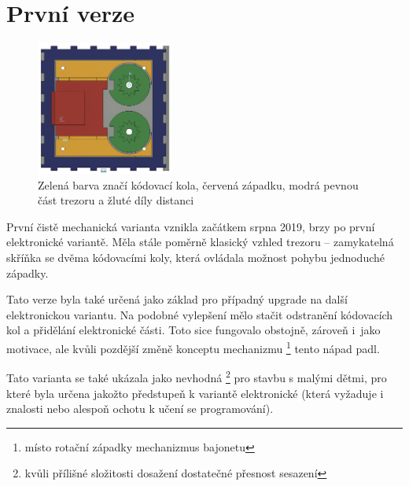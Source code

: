 \section{První verze}
\label{M1-vyvoj}

\begin{figure}
    \centering
    \includegraphics[width=0.4\textwidth]{kapitoly/obrazky/M1/mechanizmus.png}
    \caption{Zelená barva značí kódovací kola, červená západku, modrá pevnou část trezoru a žluté díly distanci \centering}
    \label{fig:M1-mechanizmus}
\end{figure}
První čistě mechanická varianta vznikla začátkem srpna 2019, brzy po první  elektronické variantě.
Měla stále poměrně klasický vzhled trezoru -- zamykatelná skříňka se dvěma  kódovacími koly, která ovládala možnost pohybu jednoduché západky.

Tato verze byla také určená jako základ pro případný upgrade na další elektronickou
variantu. Na podobné vylepšení mělo stačit odstranění kódo\-va\-cích kol a přidělání elektronické části. Toto sice fungovalo obstojně, zároveň 
i~jako motivace, ale kvůli pozdější změně konceptu mechanizmu \footnote{místo rotační západky mechanizmus bajonetu} tento nápad padl.

Tato varianta se také ukázala jako nevhodná \footnote{kvůli přílišné složitosti dosažení dostatečné přesnost sesazení} pro stavbu s malými dětmi, 
pro které byla určena jakožto předstupeň k variantě elektronické (která vyžaduje i znalosti nebo alespoň ochotu k učení se programování).

\newpage